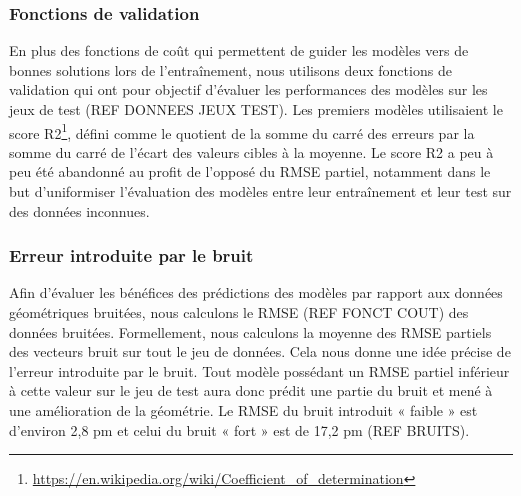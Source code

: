 \subsubsection{Fonctions de validation}

\par En plus des fonctions de coût qui permettent de guider les modèles vers de bonnes solutions lors de l'entraînement, nous utilisons deux fonctions de validation qui ont pour objectif d'évaluer les performances des modèles sur les jeux de test (REF DONNEES JEUX TEST). Les premiers modèles utilisaient le score R2\footnote{\url{https://en.wikipedia.org/wiki/Coefficient_of_determination}}, défini comme le quotient de la somme du carré des erreurs par la somme du carré de l'écart des valeurs cibles à la moyenne. Le score R2 a peu à peu été abandonné au profit de l'opposé du RMSE partiel, notamment dans le but d'uniformiser l'évaluation des modèles entre leur entraînement et leur test sur des données inconnues.

\subsubsection{Erreur introduite par le bruit}

\par Afin d'évaluer les bénéfices des prédictions des modèles par rapport aux données géométriques bruitées, nous calculons le RMSE (REF FONCT COUT) des données bruitées. Formellement, nous calculons la moyenne des RMSE partiels des vecteurs bruit sur tout le jeu de données. Cela nous donne une idée précise de l'erreur introduite par le bruit. Tout modèle possédant un RMSE partiel inférieur à cette valeur sur le jeu de test aura donc prédit une partie du bruit et mené à une amélioration de la géométrie. Le RMSE du bruit introduit « faible » est d'environ 2,8 pm et celui du bruit « fort » est de 17,2 pm (REF BRUITS).	